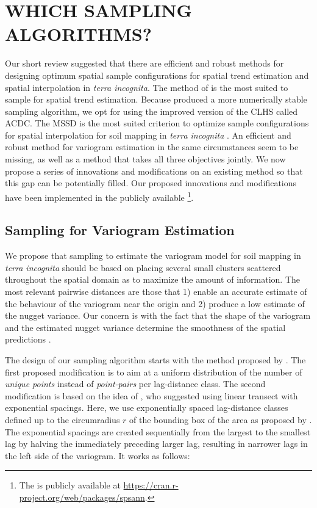 \section{WHICH SAMPLING ALGORITHMS?}

\def\footspsann{\footnote{The \Rpackage{spsann} is publicly available at 
\url{https://cran.r-project.org/web/packages/spsann}.}}

Our short review suggested that there are efficient and robust methods for designing optimum spatial sample 
configurations for spatial trend estimation and spatial interpolation in \emph{terra incognita}. The method of 
\citet{MinasnyEtAl2006b} is the most suited to sample for spatial trend estimation. Because 
\citet{Samuel-RosaEtAl2016} produced a more numerically stable sampling algorithm, we opt for using the 
improved 
version of the CLHS called ACDC. The MSSD is the most suited criterion to optimize sample configurations for 
spatial interpolation for soil mapping in \emph{terra incognita} \cite{BrusEtAl2006, WalvoortEtAl2010}. An 
efficient and robust method for variogram estimation in the same circumstances seem to be missing, as well as 
a 
method that takes all three objectives jointly. We now propose a series of innovations and modifications on an 
existing method so that this gap can be potentially filled. Our proposed innovations and modifications have 
been implemented in the publicly available \footspsann.

\subsection{Sampling for Variogram Estimation}

We propose that sampling to estimate the variogram model for soil mapping in \emph{terra incognita} should be 
based on placing several small clusters scattered throughout the spatial domain as to maximize the amount of 
information. The most relevant pairwise distances are those that 1) enable an accurate estimate of the 
behaviour of the variogram near the origin and 2) produce a low estimate of the nugget variance. Our concern 
is with the fact that the shape of the variogram and the estimated nugget variance determine the smoothness of 
the spatial predictions \cite{WebsterEtAl2007}.

The design of our sampling algorithm starts with the method proposed by \citet{WarrickEtAl1987}. The first 
proposed modification is to aim at a uniform distribution of the number of \emph{unique points} instead of 
\emph{point-pairs} per lag-distance class. The second modification is based on the idea of 
\citet{PettittEtAl1993a}, who suggested using linear transect with exponential spacings. Here, we use 
exponentially spaced lag-distance classes defined up to the circumradius $r$ of the bounding box of the area 
as proposed by \citet{TruongEtAl2013}. The exponential spacings are created sequentially from the largest to 
the smallest lag by halving the immediately preceding larger lag, resulting in narrower lags in the left 
side of the variogram. It works as follows:

